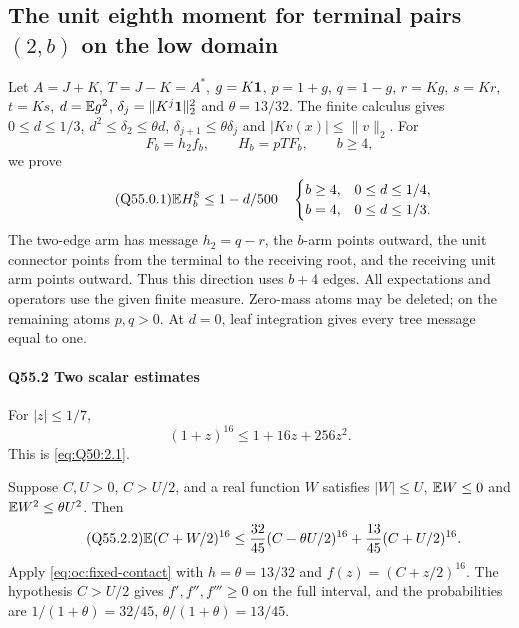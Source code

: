 \subsection{The unit eighth moment for terminal pairs $(2,\allowbreak b)$ on the low domain}\label{proof:Q5-C055}
Let $A=\allowbreak J+K$, $T=\allowbreak J-K=\allowbreak A^*$, $g=\allowbreak K\mathbf1$, $p=\allowbreak 1+g$, $q=\allowbreak 1-g$,
$r=\allowbreak Kg$, $s=\allowbreak Kr$, $t=\allowbreak Ks$, $d=\allowbreak \mathbb E g^2$, $\delta_j=\allowbreak \|K^j\mathbf1\|_2^2$
and $\theta=\allowbreak 13/32$. The finite calculus gives $0\le\allowbreak  d\le\allowbreak 1/3$,
$d^2\le\allowbreak \delta_2\le\allowbreak \theta d$, $\delta_{j+1}\le\allowbreak \theta\delta_j$ and
$|Kv(x)|\le\allowbreak \|v\|_2$. For
\[
 F_b=h_2f_b,\qquad H_b=pTF_b,\qquad b\ge4,
\]
we prove
\begin{equation}\tag{Q55.0.1}\label{eq:Q55:scope}
 \mathbb E H_b^8\le1-d/500
 \quad\begin{cases}b\ge4,&0\le d\le1/4,\\b=4,&0\le d\le1/3.\end{cases}
\end{equation}
The two-edge arm has message $h_2=\allowbreak q-r$, the $b$-arm points outward,
the unit connector points from the terminal to the receiving root, and
the receiving unit arm points outward. Thus this direction uses $b+4$ edges.
All expectations and operators use the given finite measure. Zero-mass atoms
may be deleted; on the remaining atoms $p,\allowbreak q>\allowbreak 0$. At $d=\allowbreak 0$, leaf integration
gives every tree message equal to one.

\paragraph{Q55.2 Two scalar estimates}\label{part:Q55.2}
For $|z|\le\allowbreak 1/7$,
\begin{equation}\tag{Q55.2.1}\label{eq:Q55:power}
 (1+z)^{16}\le1+16z+256z^2.
\end{equation}
This is \eqref{eq:Q50:2.1}.

Suppose $C,\allowbreak U>\allowbreak 0$, $C>\allowbreak U/2$, and a real function $W$ satisfies
$|W|\le\allowbreak  U$, $\mathbb E W\le\allowbreak 0$ and $\mathbb E W^2\le\allowbreak \theta U^2$. Then
\begin{equation}\tag{Q55.2.2}\label{eq:Q55:hermite}
 \mathbb E(C+W/2)^{16}
 \le\frac{32}{45}(C-\theta U/2)^{16}
       +\frac{13}{45}(C+U/2)^{16}.
\end{equation}
Apply \eqref{eq:oc:fixed-contact} with \(h=\theta=13/32\) and
\(f(z)=(C+z/2)^{16}\). The hypothesis \(C>U/2\) gives
\(f',f'',f'''\ge0\) on the full interval, and the probabilities are
\(1/(1+\theta)=32/45\), \(\theta/(1+\theta)=13/45\).

